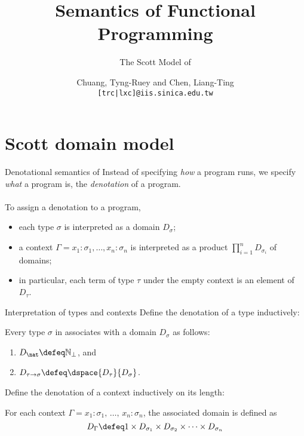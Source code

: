 \title{Semantics of Functional Programming}
\subtitle{The Scott Model of \PCF}
\author[T.-R. Chuang]{\alert{Chuang, Tyng-Ruey} and Chen, Liang-Ting  \\
  {\texttt{[\alert{trc}|lxc]@iis.sinica.edu.tw}}}

\frame{\maketitle}

\section{Scott domain model}
\begin{frame}{Denotational semantics of \PCF}
  Instead of specifying \emph{how} a \PCF{} program runs, we specify \emph{what} a
  program is, the \emph{denotation} of a program. 
  \\~\\
  To assign a denotation to a program, 
  \begin{itemize}
    \item each type $\sigma$ is interpreted as a domain $D_\sigma$;
    \item a context $\Gamma = x_1 : \sigma_1, \ldots, x_n : \sigma_n$
      is interpreted as a product $\prod_{i = 1}^n D_{\sigma_i}$ of domains;
    \item in particular, each term of type $\tau$ under the empty context
      is an element of $D_\tau$. 
  \end{itemize}
\end{frame}

\begin{frame}{Interpretation of types and contexts}
  Define the denotation of a type inductively:
  \begin{definition}
  Every type $\sigma$ in \PCF{} associates with a domain $D_\sigma$ as
  follows:
    \begin{enumerate}
      \item $D_\nat \defeq \mathbb{N}_\bot$, and
      \item $D_{\tau \to \sigma} \defeq \dspace{D_\tau}{D_{\sigma}}$.
    \end{enumerate}
  \end{definition}
  Define the denotation of a context inductively on its length:
  \begin{definition}
    For each context $\Gamma = x_1 : \sigma_1,\,
    \ldots,\, x_n : \sigma_n$, the associated domain is defined as
    \[
      D_\Gamma \defeq 1 \times D_{\sigma_1} \times D_{\sigma_2}
      \times \dots \times D_{\sigma_n}
    \]
  \end{definition}
\end{frame}

